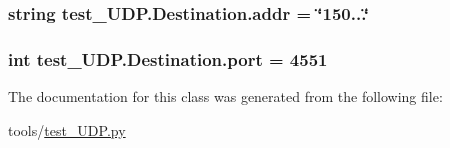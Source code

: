 \subsubsection[{addr}]{\setlength{\rightskip}{0pt plus 5cm}string test\+\_\+\+U\+D\+P.\+Destination.\+addr = \char`\"{}150...\char`\"{}\hspace{0.3cm}{\ttfamily [static]}}\label{classtest__UDP_1_1Destination_ac5fb7c516eb489d012703f654075ebe2}
\hypertarget{classtest__UDP_1_1Destination_a1d6099bcb62697225cfacab6e7db3fc9}{}
\subsubsection[{port}]{\setlength{\rightskip}{0pt plus 5cm}int test\+\_\+\+U\+D\+P.\+Destination.\+port = 4551\hspace{0.3cm}{\ttfamily [static]}}\label{classtest__UDP_1_1Destination_a1d6099bcb62697225cfacab6e7db3fc9}


The documentation for this class was generated from the following file\+:\begin{DoxyCompactItemize}
\item 
tools/\hyperlink{test__UDP_8py}{test\+\_\+\+U\+D\+P.\+py}\end{DoxyCompactItemize}

